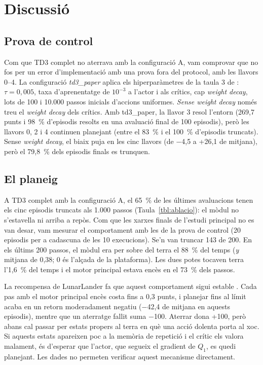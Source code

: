 \section{Discussió}\label{sec:discussio}

\subsection{Prova de control}\label{sec:control}

Com que TD3 complet no aterrava amb la configuració A, vam comprovar que no fos per un error d'implementació amb una prova fora del protocol, amb les llavors 0--4. La configuració \emph{td3\_paper} aplica els hiperparàmetres de la taula 3 de \textcite{fujimoto2018}: $\tau = 0{,}005$, taxa d'aprenentatge de $10^{-3}$ a l'actor i als crítics, cap \emph{weight decay}, lots de 100 i 10.000 passos inicials d'accions uniformes. \emph{Sense weight decay} només treu el \emph{weight decay} dels crítics. Amb td3\_paper, la llavor 3 resol l'entorn (269,7 punts i 98~\% d'episodis resolts en una avaluació final de 100 episodis), però les llavors 0, 2 i 4 continuen planejant (entre el 83~\% i el 100~\% d'episodis truncats). Sense \emph{weight decay}, el biaix puja en les cinc llavors (de −4,5 a +26,1 de mitjana), però el 79,8~\% dels episodis finals es trunquen.

\subsection{El planeig}\label{sec:planeig}

A TD3 complet amb la configuració A, el 65~\% de les últimes avaluacions tenen els cinc episodis truncats als 1.000 passos (Taula~\ref{tbl:ablacio}): el mòdul no s'estavella ni arriba a repòs. Com que les xarxes finals de l'estudi principal no es van desar, vam mesurar el comportament amb les de la prova de control (20 episodis per a cadascuna de les 10 execucions). Se'n van truncar 143 de 200. En els últims 200 passos, el mòdul era per sobre del terra el 88~\% del temps (\emph{y} mitjana de 0,38; 0 és l'alçada de la plataforma). Les dues potes tocaven terra l'1,6~\% del temps i el motor principal estava encès en el 73~\% dels passos.

La recompensa de LunarLander fa que aquest comportament sigui estable \parencite{gymnasium}. Cada pas amb el motor principal encès costa fins a 0,3 punts, i planejar fins al límit acaba en un retorn moderadament negatiu (−42,4 de mitjana en aquests episodis), mentre que un aterratge fallit suma −100. Aterrar dona +100, però abans cal passar per estats propers al terra en què una acció dolenta porta al xoc. Si aquests estats apareixen poc a la memòria de repetició i el crític els valora malament, és d'esperar que l'actor, que segueix el gradient de $Q_1$, es quedi planejant. Les dades no permeten verificar aquest mecanisme directament.

